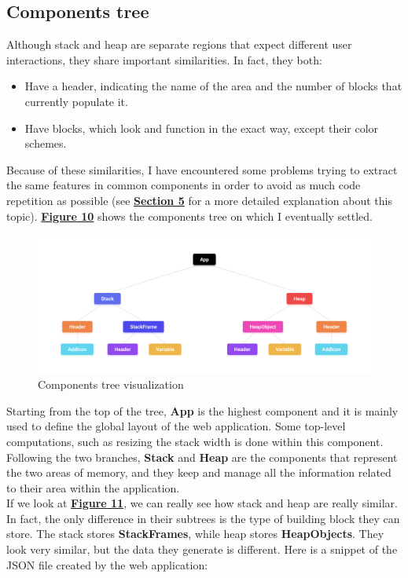 \documentclass[]{usiinfbachelorproject}
\begin{document}
\subsection{Components tree}

Although stack and heap are separate regions that expect different user interactions, they share important similarities. In fact, they both:

\begin{itemize}
	\item Have a header, indicating the name of the area and the number of blocks that currently populate it.
	\item Have blocks, which look and function in the exact way, except their color schemes.
\end{itemize}

\noindent Because of these similarities, I have encountered some problems trying to extract the same features in common components in order to avoid as much code repetition as possible (see \hyperref[]{\textbf{Section 5}} for a more detailed explanation about this topic). \hyperref[tree]{\textbf{Figure 10}} shows the components tree on which I eventually settled.

\begin{figure}[h!]
\centering
\includegraphics[width=\textwidth]{figures/tree.png}
\caption {Components tree visualization}
\label{tree}
\end{figure}

\pagebreak

\noindent Starting from the top of the tree, \textbf{App} is the highest component and it is mainly used to define the global layout of the web application. Some top-level computations, such as resizing the stack width is done within this component.\\
Following the two branches, \textbf{Stack} and \textbf{Heap} are the components that represent the two areas of memory, and they keep and manage all the information related to their area within the application.\\
If we look at \textbf{\hyperref[tree]{Figure 11}}, we can really see how stack and heap are really similar. In fact, the only difference in their subtrees is the type of building block they can store. The stack stores \textbf{StackFrames}, while heap stores \textbf{HeapObjects}. They look very similar, but the data they generate is different. Here is a snippet of the JSON file created by the web application:\\
\end{document}

